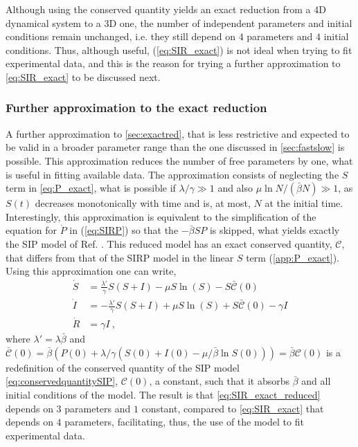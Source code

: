 Although using the conserved quantity yields an exact reduction from a 4D
dynamical system to a 3D one, the number of independent parameters and initial
conditions remain unchanged, i.e. they still depend on $4$ parameters and $4$
initial conditions. Thus, although useful, (\cref{eq:SIR_exact}) is not ideal
when trying to fit experimental data, and this is the reason for trying a
further approximation to \cref{eq:SIR_exact} to be discussed next.

\subsubsection{Further approximation to the exact reduction}
\label{sec:exactredapp}

A further approximation to \cref{sec:exactred}, that is less restrictive
and expected to be valid in a broader parameter range than the one discussed in
\cref{sec:fastslow} is possible. This approximation reduces the number of free
parameters by one, what is useful in fitting available data.
The approximation consists of neglecting the
$S$ term in \cref{eq:P_exact}, what is possible if $\lambda/\gamma\gg 1$
and also $\mu\ln N/(\bar{\beta} N)\gg 1$, as $S(t)$ decreases monotonically
with time and is, at most, $N$ at the initial time. Interestingly, this
approximation is equivalent to the simplification of the equation for $\dot{P}$
in (\cref{eq:SIRP}) so that the $-\bar{\beta}SP$ is skipped, what yields
exactly
the SIP model of Ref. \cite{article_SIP}. This reduced model has an exact
conserved quantity, $\mathcal{C}$, that differs from that of the SIRP model in
the linear $S$ term (\cref{app:P_exact}).
Using this approximation one can write,
\begin{equation}\label{eq:SIR_exact_reduced}
    \begin{aligned}
        \dot{S} & =\frac{\lambda'}{\gamma}S(S+I)-\mu
        S\ln(S)-S\bar{\mathcal{C}}(0)                 \\
        \dot{I} & =-\frac{\lambda'}{\gamma}S(S+I)+\mu
        S\ln(S)+S\bar{\mathcal{C}}(0)-\gamma I        \\
        \dot{R} & =\gamma I \ ,
    \end{aligned}
\end{equation}
where $\lambda'=\lambda\bar{\beta}$ and $\bar{\mathcal{C}}(0)=\bar{\beta}
    (P(0)+\lambda/\gamma(S(0)+I(0)-\mu/\bar{\beta}\ln S(0)))=\bar{\beta}
    \mathcal{C}(0)$ is a redefinition of the conserved quantity of the SIP
model
\cref{eq:conservedquantitySIP}, $\mathcal{C}(0)$, a constant, such that it
absorbs $\bar{\beta}$ and all initial conditions of the model. The result is
that \cref{eq:SIR_exact_reduced} depends on $3$ parameters and $1$ constant,
compared to \cref{eq:SIR_exact} that depends on $4$ parameters,
facilitating, thus, the use of the model to fit experimental data.

